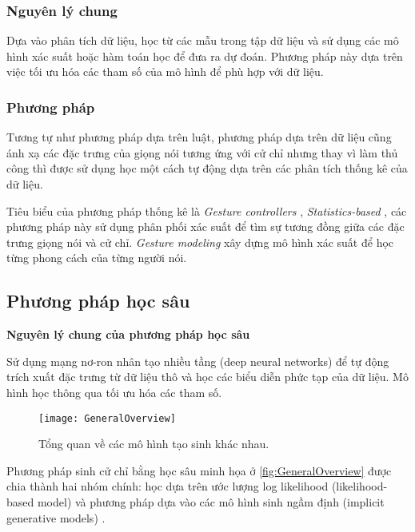 \subsubsection{Nguyên lý chung}

Dựa vào phân tích dữ liệu, học từ các mẫu trong tập dữ liệu và sử dụng các mô hình xác suất hoặc hàm toán học để đưa ra dự đoán. Phương pháp này dựa trên việc tối ưu hóa các tham số của mô hình để phù hợp với dữ liệu.

\subsubsection{Phương pháp}

Tương tự như phương pháp dựa trên luật, phương pháp dựa trên dữ liệu cũng ánh xạ các đặc trưng của giọng nói tương ứng với cử chỉ nhưng thay vì làm thủ công thì được sử dụng học một cách tự động dựa trên các phân tích thống kê của dữ liệu.

Tiêu biểu của phương pháp thống kê là \textit{Gesture controllers} \cite{levine2010gesture}, \textit{Statistics-based} \cite{yang2020statistics}, các phương pháp này sử dụng phân phối xác suất để tìm sự tương đồng giữa các đặc trưng giọng nói và cử chỉ. \textit{Gesture modeling}  \cite{neff2008gesture} xây dựng mô hình xác suất để học từng phong cách của từng người nói.

\subsection{Phương pháp học sâu}

\textbf{Nguyên lý chung của phương pháp học sâu}

Sử dụng mạng nơ-ron nhân tạo nhiều tầng (deep neural networks) để tự động trích xuất đặc trưng từ dữ liệu thô và học các biểu diễn phức tạp của dữ liệu. Mô hình học thông qua tối ưu hóa các tham số.

\begin{figure}[H]
	\centering
	\texttt{[image: GeneralOverview]}
	\caption{Tổng quan về các mô hình tạo sinh khác nhau.}
	\label{fig:GeneralOverview}
\end{figure}

Phương pháp sinh cử chỉ bằng học sâu minh họa ở \autoref{fig:GeneralOverview} được chia thành hai nhóm chính: học dựa trên ước lượng log likelihood (likelihood-based model)  và phương pháp dựa vào các mô hình sinh ngầm định (implicit generative models) \cite{song2021score}.

